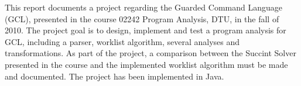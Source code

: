 
This report documents a project regarding the
Guarded Command Language (GCL), presented in the course 02242
Program Analysis, DTU, in the fall of 2010.
The project goal is to design, implement and test
a program analysis for GCL, including a parser,
worklist algorithm, several analyses and transformations.
As part of the project, a comparison between the Succint Solver
presented in the course and the implemented worklist algorithm
must be made and documented.
The project has been implemented in Java.


